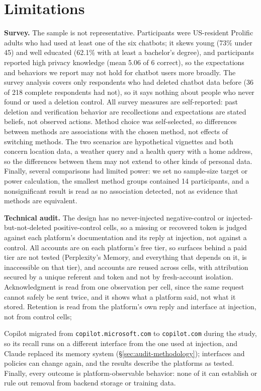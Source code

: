 \documentclass[conference,compsoc]{IEEEtran}
\begin{document}
\section{Limitations}
\label{sec:limitations}
\textbf{Survey.} The sample is not representative. Participants were
US-resident Prolific adults who had used at least one of the six chatbots; it
skews young (73\% under 45) and well educated (62.1\% with at least a bachelor's
degree), and participants reported high privacy knowledge (mean 5.06 of 6
correct), so the expectations and behaviors we report may not hold for chatbot
users more broadly. The survey analysis covers only respondents who had deleted
chatbot data before (36 of 218 complete respondents had not), so it says nothing
about people who never found or used a deletion control. All survey measures are
self-reported: past deletion and verification behavior are recollections and
expectations are stated beliefs, not observed actions. Method choice was
self-selected, so differences between methods are associations with the chosen
method, not effects of switching methods. The two scenarios are hypothetical
vignettes and both concern location data, a weather query and a health query
with a home address, so the differences between them may not extend to other
kinds of personal data. Finally, several comparisons had limited power: we set no
sample-size target or power calculation, the smallest method groups contained
14 participants, and a nonsignificant result is read as no association
detected, not as evidence that methods are equivalent.

\textbf{Technical audit.} The design has no never-injected negative-control or
injected-but-not-deleted positive-control cells, so a missing or recovered
token is judged against each platform's documentation and its reply at
injection, not against a control. All accounts are on each platform's free
tier, so surfaces behind a paid tier are not tested (Perplexity's Memory, and
everything that depends on it, is inaccessible on that tier), and accounts are
reused across cells, with attribution secured by a unique referent and token
and not by fresh-account isolation. Acknowledgment is read from one
observation per cell, since the same request cannot safely be sent twice, and
it shows what a platform said, not what it stored. Retention is read from the
platform's own reply and interface at injection, not from control cells;


Copilot migrated from \texttt{copilot.microsoft.com} to \texttt{copilot.com}
during the study, so its recall runs on a different interface from the one used
at injection, and Claude replaced its memory system
(\S\ref{sec:audit-methodology}); interfaces and policies can change again, and
the results describe the platforms as tested. Finally, every outcome is
platform-observable behavior: none of it can establish or rule out removal from
backend storage or training data.
\end{document}
